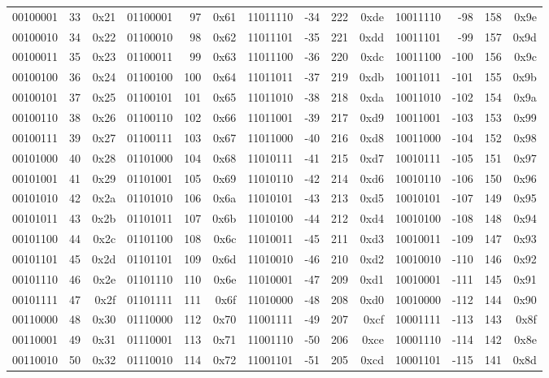 \begin{center}
{\begin{tabular}{| rrr | rrr | rrrr | rrrr |}
			00100001 & 33 & 0x21 & 01100001 & 97 & 0x61 & 11011110 & -34 & 222 & 0xde & 10011110 & -98 & 158 & 0x9e \\
			00100010 & 34 & 0x22 & 01100010 & 98 & 0x62 & 11011101 & -35 & 221 & 0xdd & 10011101 & -99 & 157 & 0x9d \\
			00100011 & 35 & 0x23 & 01100011 & 99 & 0x63 & 11011100 & -36 & 220 & 0xdc & 10011100 & -100 & 156 & 0x9c \\
			00100100 & 36 & 0x24 & 01100100 & 100 & 0x64 & 11011011 & -37 & 219 & 0xdb & 10011011 & -101 & 155 & 0x9b \\
			00100101 & 37 & 0x25 & 01100101 & 101 & 0x65 & 11011010 & -38 & 218 & 0xda & 10011010 & -102 & 154 & 0x9a \\
			00100110 & 38 & 0x26 & 01100110 & 102 & 0x66 & 11011001 & -39 & 217 & 0xd9 & 10011001 & -103 & 153 & 0x99 \\
			00100111 & 39 & 0x27 & 01100111 & 103 & 0x67 & 11011000 & -40 & 216 & 0xd8 & 10011000 & -104 & 152 & 0x98 \\
			\hline
			00101000 & 40 & 0x28 & 01101000 & 104 & 0x68 & 11010111 & -41 & 215 & 0xd7 & 10010111 & -105 & 151 & 0x97 \\
			00101001 & 41 & 0x29 & 01101001 & 105 & 0x69 & 11010110 & -42 & 214 & 0xd6 & 10010110 & -106 & 150 & 0x96 \\
			00101010 & 42 & 0x2a & 01101010 & 106 & 0x6a & 11010101 & -43 & 213 & 0xd5 & 10010101 & -107 & 149 & 0x95 \\
			00101011 & 43 & 0x2b & 01101011 & 107 & 0x6b & 11010100 & -44 & 212 & 0xd4 & 10010100 & -108 & 148 & 0x94 \\
			00101100 & 44 & 0x2c & 01101100 & 108 & 0x6c & 11010011 & -45 & 211 & 0xd3 & 10010011 & -109 & 147 & 0x93 \\
			00101101 & 45 & 0x2d & 01101101 & 109 & 0x6d & 11010010 & -46 & 210 & 0xd2 & 10010010 & -110 & 146 & 0x92 \\
			00101110 & 46 & 0x2e & 01101110 & 110 & 0x6e & 11010001 & -47 & 209 & 0xd1 & 10010001 & -111 & 145 & 0x91 \\
			00101111 & 47 & 0x2f & 01101111 & 111 & 0x6f & 11010000 & -48 & 208 & 0xd0 & 10010000 & -112 & 144 & 0x90 \\
			\hline
			00110000 & 48 & 0x30 & 01110000 & 112 & 0x70 & 11001111 & -49 & 207 & 0xcf & 10001111 & -113 & 143 & 0x8f \\
			00110001 & 49 & 0x31 & 01110001 & 113 & 0x71 & 11001110 & -50 & 206 & 0xce & 10001110 & -114 & 142 & 0x8e \\
			00110010 & 50 & 0x32 & 01110010 & 114 & 0x72 & 11001101 & -51 & 205 & 0xcd & 10001101 & -115 & 141 & 0x8d \\

\end{tabular}}
\end{center}

